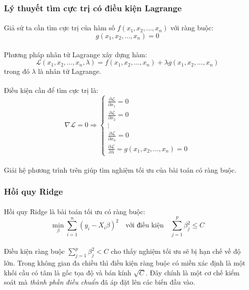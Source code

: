 \subsubsection{Lý thuyết tìm cực trị có điều kiện Lagrange}

\paragraph{}{Giả sử ta cần tìm cực trị của hàm số \( f(x_1, x_2, ..., x_n) \) với ràng buộc:}
\[
g(x_1, x_2, ..., x_n) = 0
\]
\paragraph{}{Phương pháp nhân tử Lagrange xây dựng hàm:}
\[
\mathcal{L}(x_1, x_2, ..., x_n, \lambda) = f(x_1, x_2, ..., x_n) + \lambda g(x_1, x_2, ..., x_n)
\]
trong đó \( \lambda \) là nhân tử Lagrange.

\paragraph{}{Điều kiện cần để tìm cực trị là:}
\[
\nabla \mathcal{L} = 0 \Rightarrow  
\begin{cases}  
\frac{\partial \mathcal{L}}{\partial x_1} = 0 \\  
\frac{\partial \mathcal{L}}{\partial x_2} = 0 \\  
\vdots \\  
\frac{\partial \mathcal{L}}{\partial x_n} = 0 \\  
\frac{\partial \mathcal{L}}{\partial \lambda} = g(x_1, x_2, ..., x_n) = 0  
\end{cases}
\]
\paragraph{}{Giải hệ phương trình trên giúp tìm nghiệm tối ưu của bài toán có ràng buộc.}

\subsubsection{Hồi quy Ridge}
\label{label:ridge-math}
\paragraph{}{Hồi quy Ridge \cite{phamkhanh-ridge-regression} là bài toán tối ưu có ràng buộc:}
\[
\min_{\beta} \sum_{i=1}^{n} (y_i - X_i\beta)^2 \quad \text{với điều kiện} \quad \sum_{j=1}^{p} \beta_j^2 \leq C
\]
\paragraph{}{Điều kiện ràng buộc \( \sum_{j=1}^{p} \beta_j^2 < C \) cho thấy nghiệm tối ưu sẽ bị hạn chế về độ lớn. Trong không gian đa chiều thì điều kiện ràng buộc có miền xác định là một khối cầu có tâm là gốc tọa độ và bán kính \( \sqrt{C} \). Đây chính là một cơ chế kiểm soát mà \textit{thành phần điều chuẩn} đã áp đặt lên các biến đầu vào.}
